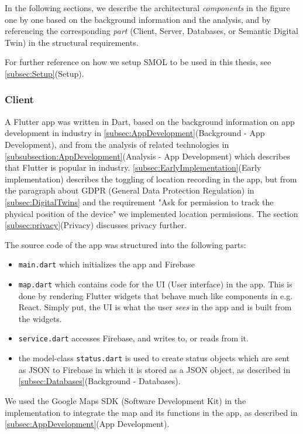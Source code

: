 \documentclass{article}
\begin{document}
In the following sections, we describe the architectural \emph{components} in the figure one by one based on the background information and the analysis, and by referencing the corresponding \emph{part} (Client, Server, Databases, or Semantic Digital Twin) in the structural requirements.

For further reference on how we setup SMOL to be used in this thesis, see \ref{subsec:Setup}(Setup).

\subsubsection{Client}
A Flutter app was written in Dart, based on the background information on app development in industry in \ref{subsec:AppDevelopment}(Background - App Development), and from the analysis of related technologies in \ref{subsubsection:AppDevelopment}(Analysis - App Development) which describes that Flutter is popular in industry. \ref{subsec:EarlyImplementation}(Early implementation) describes the toggling of location recording in the app, but from the paragraph about GDPR (General Data Protection Regulation) in \ref{subsec:DigitalTwins} and the requirement "Ask for permission to track the physical position of the device" we implemented location permissions. The section \ref{subsec:privacy}(Privacy) discusses privacy further.

The source code of the app was structured into the following parts: 
\begin{itemize}
    \item \verb|main.dart| which initializes the app and Firebase
    \item \verb|map.dart| which contains code for the UI (User interface) in the app. This is done by rendering Flutter widgets that behave much like components in e.g. React. Simply put, the UI is what the user \emph{sees} in the app and is built from the widgets.
    \item \verb|service.dart| accesses Firebase, and writes to, or reads from it.
    \item the model-class \verb|status.dart| is used to create status objects which are sent as JSON to Firebase in which it is stored as a JSON object, as described in \ref{subsec:Databases}(Background - Databases).
\end{itemize}
We used the Google Maps SDK (Software Development Kit) in the implementation to integrate the map and its functions in the app, as described in \ref{subsec:AppDevelopment}(App Development).
\end{document}
